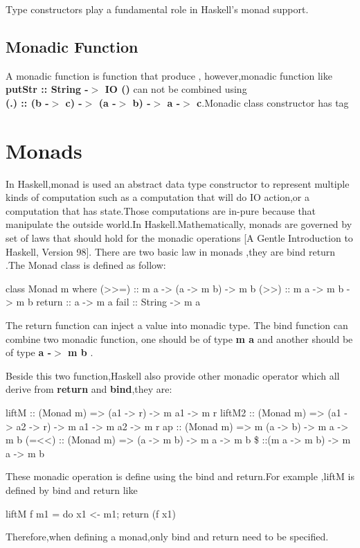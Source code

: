 Type constructors play a fundamental role in Haskell's monad support.
\subsection{Monadic Function}
A monadic function is function that produce , however,monadic function like \textbf{putStr :: String -$>$ IO ()} can not be combined using \\ \textbf{(.) :: (b -$>$ c) -$>$ (a -$>$ b) -$>$ a -$>$ c}.Monadic class constructor has tag 



\section{Monads}
In Haskell,monad is used an abstract data type constructor to represent multiple kinds of computation such as a computation that will do IO action,or a computation that has state.Those computations are in-pure because that manipulate the outside world.In Haskell.Mathematically, monads are governed by set of laws that should hold for the monadic operations [A Gentle Introduction to Haskell, Version 98]. There are two basic law in monads ,they are bind return .The Monad class is defined as follow:
\begin{hcode}
class Monad m where
  (>>=) :: m a -> (a -> m b) -> m b
  (>>) :: m a -> m b -> m b
  return :: a -> m a
  fail :: String -> m a
\end{hcode}

The return function can inject a value into monadic type.
The bind function can combine two monadic function, one should be of type \textbf{m a} and another should be of type \textbf{a -$>$ m b} .

Beside this two function,Haskell also provide other monadic operator which all derive from \textbf{return} and \textbf{bind},they are:
\begin{hexample}
liftM :: (Monad m) => (a1 -> r) -> m a1 -> m r
liftM2  :: (Monad m) => (a1 -> a2 -> r) -> m a1 -> m a2 -> m r
ap :: (Monad m) => m (a -> b) -> m a -> m b
(=<<) :: (Monad m) => (a -> m b) -> m a -> m b
\$ ::(m a -> m b) -> m a -> m b 
\end{hexample}

These monadic operation is define using the bind and return.For example ,liftM is defined by bind and return like 
\begin{hcode}
liftM f m1              = do { x1 <- m1; return (f x1) }
\end{hcode}
Therefore,when defining a monad,only bind and return need to be specified.

